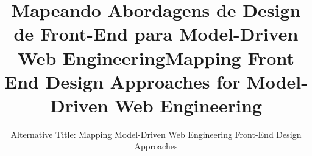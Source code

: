 \documentclass{sig-alternate}
\begin{document}
\title{Mapeando Abordagens de Design de Front-End para Model-Driven Web Engineering}
\title{Mapping Front End Design Approaches for Model-Driven Web Engineering}
\subtitle{Alternative Title: Mapping Model-Driven Web Engineering Front-End Design Approaches}













\maketitle
\end{document}
